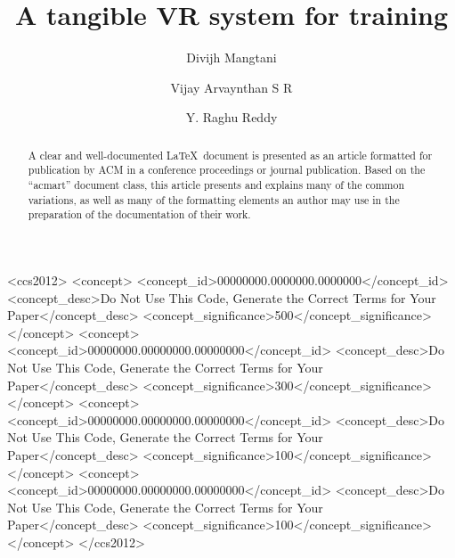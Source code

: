 \documentclass[sigconf]{acmart}
\begin{document}
\title{A tangible VR system for training}

\author{Divijh Mangtani}
\author{Vijay Arvaynthan S R}
\correspondingauthor
\authornotemark[1]

\author{Y. Raghu Reddy}

\renewcommand{\shortauthors}{Trovato et al.}

\begin{abstract}
  A clear and well-documented \LaTeX\ document is presented as an
  article formatted for publication by ACM in a conference proceedings
  or journal publication. Based on the ``acmart'' document class, this
  article presents and explains many of the common variations, as well
  as many of the formatting elements an author may use in the
  preparation of the documentation of their work.
\end{abstract}

\begin{CCSXML}
<ccs2012>
 <concept>
  <concept_id>00000000.0000000.0000000</concept_id>
  <concept_desc>Do Not Use This Code, Generate the Correct Terms for Your Paper</concept_desc>
  <concept_significance>500</concept_significance>
 </concept>
 <concept>
  <concept_id>00000000.00000000.00000000</concept_id>
  <concept_desc>Do Not Use This Code, Generate the Correct Terms for Your Paper</concept_desc>
  <concept_significance>300</concept_significance>
 </concept>
 <concept>
  <concept_id>00000000.00000000.00000000</concept_id>
  <concept_desc>Do Not Use This Code, Generate the Correct Terms for Your Paper</concept_desc>
  <concept_significance>100</concept_significance>
 </concept>
 <concept>
  <concept_id>00000000.00000000.00000000</concept_id>
  <concept_desc>Do Not Use This Code, Generate the Correct Terms for Your Paper</concept_desc>
  <concept_significance>100</concept_significance>
 </concept>
</ccs2012>
\end{CCSXML}
\end{document}
